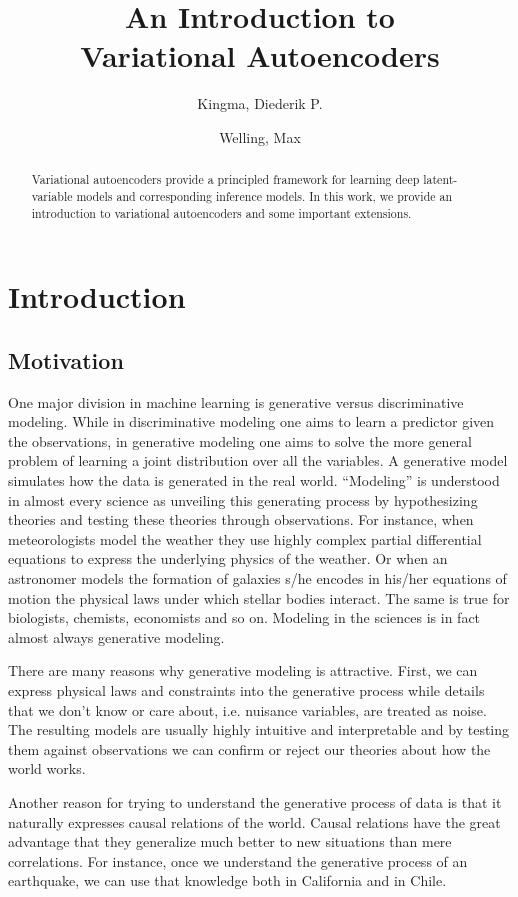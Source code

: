 \documentclass[MAL,biber]{nowfnt} %
\title{An Introduction to\\
Variational Autoencoders}
\author[1]{Kingma, Diederik P.}
\author[2,3]{Welling, Max}
\affil[1]{Google; durk@google.com}
\affil[2]{Universiteit van Amsterdam}
\affil[3]{Qualcomm; mwelling@qti.qualcomm.com}
\begin{document}
\makeabstracttitle

\begin{abstract}
Variational autoencoders provide a principled framework for learning deep latent-variable models and corresponding inference models. In this work, we provide an introduction to variational autoencoders and some important extensions.
\end{abstract}

\chapter{Introduction}
\label{chap:introduction}

\section{Motivation}

One major division in machine learning is generative versus discriminative modeling. While in discriminative modeling one aims to learn a predictor given the observations, in generative modeling one aims to solve the more general problem of learning a joint distribution over all the variables. A generative model simulates how the data is generated in the real world. ``Modeling'' is understood in almost every science as unveiling this generating process by hypothesizing theories and testing these theories through observations. For instance, when meteorologists model the weather they use highly complex partial differential equations to express the underlying physics of the weather. Or when an astronomer models the formation of galaxies s/he encodes in his/her equations of motion the physical laws under which stellar bodies interact. The same is true for biologists, chemists, economists and so on. Modeling in the sciences is in fact almost always generative modeling.

There are many reasons why generative modeling is attractive. First, we can express physical laws and constraints into the generative process while details that we don't know or care about, i.e. nuisance variables, are treated as noise. The resulting models are usually highly intuitive and  interpretable and by testing them against observations we can confirm or reject our theories about how the world works. 

Another reason for trying to understand the generative process of data is that it naturally expresses causal relations of the world. Causal relations have the great advantage that they generalize much better to new situations than mere correlations. For instance, once we understand the generative process of an earthquake, we can use that knowledge both in California and in Chile. 
\end{document}
